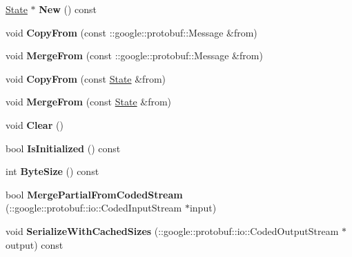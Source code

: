 \begin{DoxyCompactItemize}
\item 
\hypertarget{classgraph_1_1State_a28b26e430542a30cfe3b79a0b86eacb2}{
\hyperlink{classgraph_1_1State}{State} $\ast$ {\bfseries New} () const }
\label{classgraph_1_1State_a28b26e430542a30cfe3b79a0b86eacb2}

\item 
\hypertarget{classgraph_1_1State_a9f329c3d5f8b4d2e42c7a7b8e9b2a5e6}{
void {\bfseries CopyFrom} (const ::google::protobuf::Message \&from)}
\label{classgraph_1_1State_a9f329c3d5f8b4d2e42c7a7b8e9b2a5e6}

\item 
\hypertarget{classgraph_1_1State_a3f0b1f20bac33c7254938c2e4dc44961}{
void {\bfseries MergeFrom} (const ::google::protobuf::Message \&from)}
\label{classgraph_1_1State_a3f0b1f20bac33c7254938c2e4dc44961}

\item 
\hypertarget{classgraph_1_1State_a2e62ade5c5af34b509befbbb2c36afd3}{
void {\bfseries CopyFrom} (const \hyperlink{classgraph_1_1State}{State} \&from)}
\label{classgraph_1_1State_a2e62ade5c5af34b509befbbb2c36afd3}

\item 
\hypertarget{classgraph_1_1State_a696753acbfc23dc59a3a4f47fd99b615}{
void {\bfseries MergeFrom} (const \hyperlink{classgraph_1_1State}{State} \&from)}
\label{classgraph_1_1State_a696753acbfc23dc59a3a4f47fd99b615}

\item 
\hypertarget{classgraph_1_1State_a20caa4e8b3584fb112bfc2b9a8e082ff}{
void {\bfseries Clear} ()}
\label{classgraph_1_1State_a20caa4e8b3584fb112bfc2b9a8e082ff}

\item 
\hypertarget{classgraph_1_1State_a01736d44a021a0bbc28676c35de6339d}{
bool {\bfseries IsInitialized} () const }
\label{classgraph_1_1State_a01736d44a021a0bbc28676c35de6339d}

\item 
\hypertarget{classgraph_1_1State_a89767644e0b92a1be04e504b35504bbc}{
int {\bfseries ByteSize} () const }
\label{classgraph_1_1State_a89767644e0b92a1be04e504b35504bbc}

\item 
\hypertarget{classgraph_1_1State_ae0c84f0786cb0690d7e473a718a3365d}{
bool {\bfseries MergePartialFromCodedStream} (::google::protobuf::io::CodedInputStream $\ast$input)}
\label{classgraph_1_1State_ae0c84f0786cb0690d7e473a718a3365d}

\item 
\hypertarget{classgraph_1_1State_a8261a94d9575d04e9dde511a2e1e16ce}{
void {\bfseries SerializeWithCachedSizes} (::google::protobuf::io::CodedOutputStream $\ast$output) const }
\label{classgraph_1_1State_a8261a94d9575d04e9dde511a2e1e16ce}


\end{DoxyCompactItemize}
